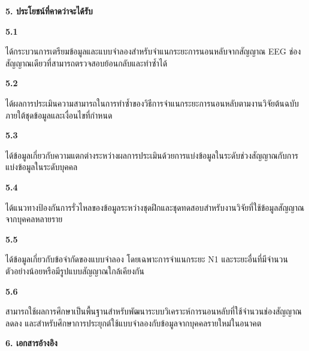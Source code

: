\documentclass[12pt,a4paper]{article}
\newcommand{\mainsection}[1]{%
  \par\vspace{0.65\baselineskip}%
  \noindent\textbf{#1}\par\nobreak\vspace{0.2\baselineskip}%
}
\newcommand{\subsectionthai}[1]{%
  \par\vspace{0.35\baselineskip}%
  \noindent\textbf{#1}\par\nobreak\vspace{0.1\baselineskip}%
}
\newcommand{\schedulearrow}[3]{%
  \pgfmathsetmacro{\arrowy}{-1.40-(#1-0.5)*1.22}%
  \pgfmathsetmacro{\arrowxstart}{8.08+(#2-1)*0.66+0.12}%
  \pgfmathsetmacro{\arrowxend}{8.08+#3*0.66-0.12}%
  \draw[{Latex[length=2.0mm]}-{Latex[length=2.0mm]},line width=0.55pt]
    (\arrowxstart,\arrowy) -- (\arrowxend,\arrowy);
}
\begin{document}
\begin{center}
\end{center}

\mainsection{5. ประโยชน์ที่คาดว่าจะได้รับ}

\subsectionthai{5.1}
ได้กระบวนการเตรียมข้อมูลและแบบจำลองสำหรับจำแนกระยะการนอนหลับจากสัญญาณ EEG ช่องสัญญาณเดียวที่สามารถตรวจสอบย้อนกลับและทำซ้ำได้

\subsectionthai{5.2}
ได้ผลการประเมินความสามารถในการทำซ้ำของวิธีการจำแนกระยะการนอนหลับตามงานวิจัยต้นฉบับภายใต้ชุดข้อมูลและเงื่อนไขที่กำหนด

\subsectionthai{5.3}
ได้ข้อมูลเกี่ยวกับความแตกต่างระหว่างผลการประเมินด้วยการแบ่งข้อมูลในระดับช่วงสัญญาณกับการแบ่งข้อมูลในระดับบุคคล

\subsectionthai{5.4}
ได้แนวทางป้องกันการรั่วไหลของข้อมูลระหว่างชุดฝึกและชุดทดสอบสำหรับงานวิจัยที่ใช้ข้อมูลสัญญาณจากบุคคลหลายราย

\subsectionthai{5.5}
ได้ข้อมูลเกี่ยวกับข้อจำกัดของแบบจำลอง โดยเฉพาะการจำแนกระยะ N1 และระยะอื่นที่มีจำนวนตัวอย่างน้อยหรือมีรูปแบบสัญญาณใกล้เคียงกัน

\subsectionthai{5.6}
สามารถใช้ผลการศึกษาเป็นพื้นฐานสำหรับพัฒนาระบบวิเคราะห์การนอนหลับที่ใช้จำนวนช่องสัญญาณลดลง และสำหรับศึกษาการประยุกต์ใช้แบบจำลองกับข้อมูลจากบุคคลรายใหม่ในอนาคต

\mainsection{6. เอกสารอ้างอิง}
\end{document}

